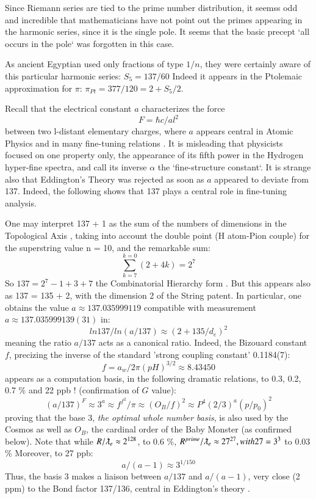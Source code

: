 \documentclass[twoside,draft]{article}
\begin{document}
\begin{sloppypar}
Since Riemann series are tied to the prime number distribution, it seemss odd and incredible that mathematicians
have not point out the primes appearing in the harmonic series, since it is the single pole. It seems
that the basic precept `all occurs in the pole` was forgotten in this case. 

As ancient Egyptian used only fractions of type $1/n$, they were certainly aware of this particular harmonic series: 
$S_{5} = 137/60$
Indeed it appears in the Ptolemaic approximation for $\pi$: $\pi_{Pt} = 377/120 = 2 +  S_{5}/2$.

Recall that the electrical constant $a$ characterizes the force $$F =\hbar c/al^{2}$$ between two l-distant
elementary charges, where $a$ appears central in Atomic Physics and in many fine-tuning relations \cite{Carr}. It is
misleading that physicists focused on one property only, the appearance of its fifth power in the
Hydrogen hyper-fine spectra, and call its inverse $\alpha$ the `fine-structure constant`. It is strange also that
Eddington's Theory was rejected as soon as $a$ appeared to deviate from 137. Indeed, the
following shows that 137 plays a central role in fine-tuning analysis. 

One may interpret 137 + 1 as
the sum of the numbers of dimensions in the Topological Axis \cite{Sanchez1}, taking into account the double
point (H atom-Pion couple) for the superstring value n = 10, and the remarkable sum:
\begin{equation}
\sum_{k=7}^{k=0}(2 + 4 k ) = 2^{7}
\end{equation}
So $137 = 2^{7} - 1 + 3 + 7$ the Combinatorial Hierarchy form \cite{Sanchez1}. But this appears also as 137 = 135 + 2,
with the dimension 2 of the String patent. In particular, one obtains the value $a \approx 137.035999119$
compatible with measurement $a \approx 137.035999139(31)$ in:
\begin{equation}
ln137/ln(a/137) \approx (2+135/d_{e})^{2}
\end{equation}
meaning the ratio $a/137$ acts as a canonical ratio. Indeed, the Bizouard constant $f$, precizing \cite{Sanchez1} the inverse of the standard 'strong coupling constant' 0.1184(7): $$f = a_w/2\pi(pH)^{3/2} \approx 8.43450$$ appears as a computation basis, in the following dramatic relations, to 0.3, 0.2, 0.7 \% and 22 ppb ! (confirmation of $G$ value):
$$(a/137)^F \approx 3^a \approx f^{f^2}/\pi \approx (O_B/f)^2 \approx P^4 (2/3)^a (p/p_0)^2 $$
proving that the base 3, \textit{the optimal whole number basis}, is also used by the Cosmos as well as $O_B$, the cardinal order  of the Baby Monster (as confirmed below). 
Note that while $R/\lambdabar_e \approx 2^{128}$, to 0.6 \%, $R^{prime}/\lambdabar_e \approx 27^{27}, with 27 = 3^3$ to 0.03 \%  Moreover, to 27 ppb:
$$ a/(a-1) \approx 3^{1/150} $$
Thus, the basis 3 makes a liaison between $a/137$ and $a/(a-1)$, very close (2 ppm) to the Bond factor 137/136, central in Eddington's theory \cite{Eddy}.

\end{sloppypar}
\end{document}
